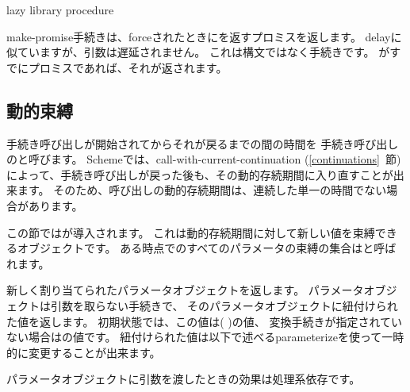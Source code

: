 \begin{entry}{%
 { }{lazy library procedure}}

{\cf make-promise}手続きは、forceされたときにを返すプロミスを返します。
{\cf delay}に似ていますが、引数は遅延されません。
これは構文ではなく手続きです。
がすでにプロミスであれば、それが返されます。

\end{entry}

\subsection{動的束縛}\unsection

手続き呼び出しが開始されてからそれが戻るまでの間の時間を
手続き呼び出しのと呼びます。
Schemeでは、{\cf call-with-current-continuation} (\ref{continuations}~節)
によって、手続き呼び出しが戻った後も、その動的存続期間に入り直すことが出来ます。
そのため、呼び出しの動的存続期間は、連続した単一の時間でない場合があります。

この節ではが導入されます。
これは動的存続期間に対して新しい値を束縛できるオブジェクトです。
ある時点でのすべてのパラメータの束縛の集合はと呼ばれます。

\begin{entry}{%
}

新しく割り当てられたパラメータオブジェクトを返します。
パラメータオブジェクトは引数を取らない手続きで、
そのパラメータオブジェクトに紐付けられた値を返します。
初期状態では、この値は{\cf ( )}の値、
変換手続きが指定されていない場合はの値です。
紐付けられた値は以下で述べる{\cf parameterize}を使って一時的に変更することが出来ます。

パラメータオブジェクトに引数を渡したときの効果は処理系依存です。
\end{entry}


